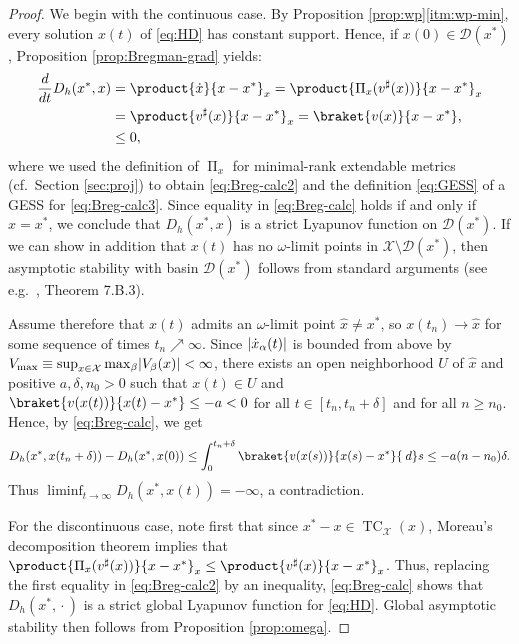 \documentclass[reqno]{amsart}
\DeclarePairedDelimiter{\abs}{\lvert}{\rvert}
\theoremstyle{plain}
\theoremstyle{definition}
\theoremstyle{remark}
\numberwithin{equation}{section}
\numberwithin{theorem}{section}
\begin{document}
\begin{proof}
We begin with the continuous case.
By Proposition \ref{prop:wp}\eqref{itm:wp-min}, every solution $x(t)$ of \eqref{eq:HD} has constant support.
Hence, if $x(0) \in {\mathcal{D}}({x^{\ast}})$, Proposition \ref{prop:Bregman-grad} yields:
\begin{subequations}
\label{eq:Breg-calc}
\begin{flalign}
\frac{d}{dt} {D_{h}}({x^{\ast}},x)
	&
	= \product{\dot x}{x - {x^{\ast}}}_{x}
	= \product{\operatorname{\Pi}_{x}({v}^{\sharp}(x))}{x - {x^{\ast}}}_{x}
	\notag\\
	&\label{eq:Breg-calc2}
	= \product{{v}^{\sharp}(x)}{x - {x^{\ast}}}_{x}
	= \braket{{v}(x)}{x - {x^{\ast}}},
	\\
	&\label{eq:Breg-calc3}
	\leq 0,
\end{flalign}
\end{subequations}
where we used the definition of $\operatorname{\Pi}_{x}$ for minimal-rank extendable metrics (cf.~Section \ref{sec:proj}) to obtain \eqref{eq:Breg-calc2} and the definition \eqref{eq:GESS} of a \ac{GESS} for \eqref{eq:Breg-calc3}.
Since equality in \eqref{eq:Breg-calc} holds if and only if $x = {x^{\ast}}$, we conclude that ${D_{h}}({x^{\ast}},x)$ is a strict Lyapunov function on ${\mathcal{D}}({x^{\ast}})$.
If we can show in addition that $x(t)$ has no $\omega$-limit points in ${\mathcal{X}}\setminus{\mathcal{D}}({x^{\ast}})$, then asymptotic stability with basin ${\mathcal{D}}({x^{\ast}})$ follows from standard arguments (see e.g.~\cite{San10}, Theorem 7.B.3).

Assume therefore that $x(t)$ admits an $\omega$-limit point ${\hat x} \neq {x^{\ast}}$, so $x(t_{n})\to {\hat x}$ for some sequence of times $t_{n}\nearrow\infty$.
Since $\abs{\dot x_{\alpha}(t)}$ is bounded from above by ${V}_{\max} \equiv \sup_{x\in{\mathcal{X}}} \max_{\beta} \abs{{V}_{\beta}(x)} < \infty$, there exists an open neighborhood $U$ of ${\hat x}$ and positive $a,\delta,n_{0} > 0$ such that $x(t) \in U$ and $\braket{{v}(x(t))}{x(t) - {x^{\ast}}} \leq -a < 0$ for all $t\in[t_{n},t_{n}+\delta]$ and for all $n\geq n_{0}$.
Hence, by \eqref{eq:Breg-calc}, we get
\begin{equation}\label{eq:and}
{D_{h}}({x^{\ast}},x(t_{n}+\delta)) - {D_{h}}({x^{\ast}},x(0))
	\leq \int_{0}^{t_{n}+\delta} \braket{{v}(x(s))}{x(s) - {x^{\ast}}} {\:d} s
	\leq -a(n-n_0)\delta.
\end{equation}
Thus $\liminf_{t\to\infty} {D_{h}}({x^{\ast}},x(t)) = -\infty$, a contradiction.

For the discontinuous case, note first that since ${x^{\ast}} - x \in \operatorname{TC}_{\mathcal{X}}(x)$, Moreau's decomposition theorem implies that $\product{\operatorname{\Pi}_{x}({v}^{\sharp}(x))}{x - {x^{\ast}}}_{x} \leq \product{{v}^{\sharp}(x)}{x-{x^{\ast}}}_{x}$.
Thus, replacing the first equality in \eqref{eq:Breg-calc2} by an inequality, \eqref{eq:Breg-calc} shows that ${D_{h}}({x^{\ast}},{\mathopen{}\cdot\mathopen{}})$ is a strict global Lyapunov function for \eqref{eq:HD}.
Global asymptotic stability then follows from Proposition \ref{prop:omega}.
\end{proof}
\end{document}
